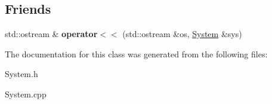 \subsection*{Friends}
\begin{DoxyCompactItemize}
\item 
\mbox{\label{classSystem_a1efa95132e95a7a6b11c3b54916d66ae}} 
std\+::ostream \& {\bfseries operator$<$$<$} (std\+::ostream \&os, \mbox{\hyperlink{classSystem}{System}} \&sys)
\end{DoxyCompactItemize}


The documentation for this class was generated from the following files\+:\begin{DoxyCompactItemize}
\item 
System.\+h\item 
System.\+cpp\end{DoxyCompactItemize}
